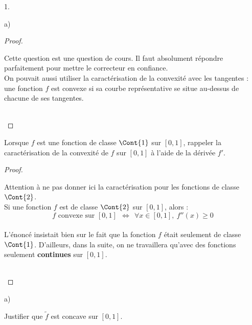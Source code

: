 \begin{noliste}{1.}
\begin{noliste}{a)}
\begin{proof}
    
    \begin{remark}
      Cette question est une question de cours. Il faut absolument 
      répondre parfaitement pour mettre le correcteur en confiance.\\ 
      On pouvait aussi utiliser la caractérisation de la convexité 
      avec les tangentes :
      une fonction $f$ est convexe si sa courbe représentative se situe 
      au-dessus de chacune de ses tangentes.
    \end{remark}~\\[-1.4cm]
  \end{proof}
  
  
  

  
  \item Lorsque $f$ est une fonction de classe $\Cont{1}$ sur $[0,1]$, 
  rappeler la caractérisation de la convexité de $f$ sur $[0,1]$ à 
  l'aide de la dérivée $f'$.
  
  \begin{proof}~
    
    \begin{remark}
      Attention à ne pas donner ici la caractérisation pour les 
      fonctions de classe $\Cont{2}$. \\
      Si une fonction $f$ est de classe 
      $\Cont{2}$ sur $[0,1]$, alors :~\\[-.4cm]
      \[
        \text{$f$ convexe sur $[0,1]$} \ \ \Leftrightarrow \ \
        \forall x \in [0,1], \ f''(x) \geq 0
      \]~\\[-.6cm]
      L'énoncé insistait bien sur le fait que la fonction $f$ était 
      seulement de classe $\Cont{1}$. D'ailleurs, dans la suite, on ne
      travaillera qu'avec des fonctions seulement {\bf continues} sur 
      $[0,1]$.
    \end{remark}~\\[-1.4cm]
  \end{proof}

 \end{noliste}
 
 \item 
 \begin{noliste}{a)}
  \setlength{\itemsep}{2mm}
  \item Justifier que $\tilde{f}$ est concave sur $[0,1]$.
  

\end{noliste}
\end{noliste}
